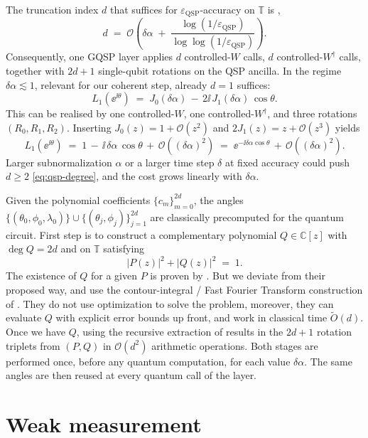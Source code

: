 The truncation index $d$ that suffices for $\varepsilon_\mathrm{QSP}$-accuracy on $\mathbb{T}$ is \cite[Thm. 7]{motlagh2024generalized}, 
\begin{equation} \label{eq:qsp-degree}
    d \;=\; \mathcal{O}\!\left(\delta\alpha \;+\; \frac{\log(1/\varepsilon_\text{QSP})}{\log\log(1/\varepsilon_\text{QSP})}\right).
\end{equation}
Consequently, one GQSP layer applies $d$ controlled-$W$ calls, $d$ controlled-$W^\dagger$ calls, together with $2d + 1$ single-qubit rotations on the QSP ancilla. In the regime $\delta\alpha \lesssim 1$, relevant for our coherent step, already $d=1$ suffices:
$$
L_1(\ee^{\ii\theta}) \;=\; J_0(\delta\alpha) \,-\, 2\ii\,J_1(\delta\alpha)\,\cos\theta.
$$
This can be realised by one controlled-$W$, one controlled-$W^\dagger$, and three rotations $(R_0, R_1, R_2)$. Inserting $J_0(z) = 1 + \mathcal{O}(z^2)$ and $2J_1(z) = z + \mathcal{O}(z^3)$ yields
$$
L_1(\ee^{\ii\theta}) \;=\; 1 \,-\, \ii\,\delta\alpha\,\cos\theta \,+\, \mathcal{O}((\delta\alpha)^2) \;=\; \ee^{-\ii\delta\alpha\cos\theta} \,+\, \mathcal{O}((\delta\alpha)^2).
$$
Larger subnormalization $\alpha$ or a larger time step $\delta$ at fixed accuracy could push $d \geq 2$ \eqref{eq:qsp-degree}, and the cost grows linearly with $\delta \alpha$. 

Given the polynomial coefficients $\{c_m\}_{m=0}^{2d}$, the angles $\{(\theta_0,\phi_0,\lambda_0)\}\cup\{(\theta_j,\phi_j)\}_{j=1}^{2d}$ are classically precomputed for the quantum circuit. First step is to construct a complementary polynomial $Q\in\mathbb{C}[z]$ with $\deg Q = 2d$ and on $\mathbb{T}$ satisfying
$$
|P(z)|^2 + |Q(z)|^2 \;=\; 1.
$$
The existence of $Q$ for a given $P$ is proven by \cite[Thm. 4]{motlagh2024generalized}. But we deviate from their proposed way, and use the contour-integral / Fast Fourier Transform construction of \cite{berntson2025complementary}. They do not use optimization to solve the problem, moreover, they can evaluate $Q$ with explicit error bounds up front, and work in classical time $\tilde{O}(d)$. Once we have $Q$, using the recursive extraction of \cite[Alg. 1]{motlagh2024generalized} results in the $2d + 1$ rotation triplets from $(P, Q)$ in $\mathcal{O}(d^2)$ arithmetic operations. Both stages are performed once, before any quantum computation, for each value $\delta \alpha$. The same angles are then reused at every quantum call of the layer. 

\smallskip
\section{Weak measurement} \label{sec:prelim-weak-meas}

